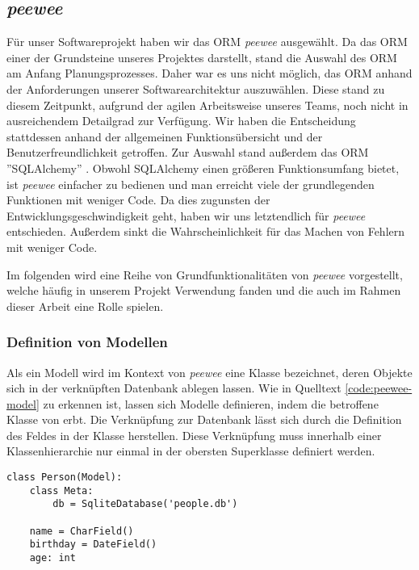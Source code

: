 \subsection{\emph{peewee}}
Für unser Softwareprojekt haben wir das ORM \emph{peewee} \cite{leifer_coleiferpeewee_2023} ausgewählt. Da das ORM einer der Grundsteine unseres Projektes darstellt, stand die Auswahl des ORM am Anfang Planungsprozesses. Daher war es uns nicht möglich, das ORM  anhand der Anforderungen unserer Softwarearchitektur auszuwählen. Diese stand zu diesem Zeitpunkt, aufgrund der agilen Arbeitsweise unseres Teams, noch nicht in ausreichendem Detailgrad zur Verfügung. Wir haben die Entscheidung stattdessen anhand der allgemeinen Funktionsübersicht und der Benutzerfreundlichkeit getroffen. Zur Auswahl stand außerdem das ORM ''SQLAlchemy'' \cite{noauthor_sqlalchemy_2023}. Obwohl SQLAlchemy einen größeren Funktionsumfang bietet, ist \emph{peewee} einfacher zu bedienen und man erreicht viele der grundlegenden Funktionen mit weniger Code. Da dies zugunsten der Entwicklungsgeschwindigkeit geht, haben wir uns letztendlich für \emph{peewee} entschieden. Außerdem sinkt die Wahrscheinlichkeit für das Machen von Fehlern mit weniger Code.

Im folgenden wird eine Reihe von Grundfunktionalitäten von \emph{peewee} vorgestellt, welche häufig in unserem Projekt Verwendung fanden und die auch im Rahmen dieser Arbeit eine Rolle spielen.

\subsubsection*{Definition von Modellen}

Als ein Modell wird im Kontext von \emph{peewee} eine Klasse bezeichnet, deren Objekte sich in der verknüpften Datenbank ablegen lassen. Wie in Quelltext \ref{code:peewee-model} zu erkennen ist, lassen sich Modelle definieren, indem die betroffene Klasse von  erbt. Die Verknüpfung zur Datenbank lässt sich durch die Definition des Feldes  in der Klasse  herstellen. Diese Verknüpfung muss innerhalb einer Klassenhierarchie nur einmal in der obersten Superklasse definiert werden.

\lstset{language=python}
\begin{lstlisting}[caption={Python-Code zur Definition eines \emph{peewee}-Modells. Es modelliert eine Person mit einem Namen und einem Geburtstag. Weiterhin besitzt die Klasse das nicht-persistente Feld \code{age}. \cite{noauthor_quickstart_2023}}, label=code:peewee-model]
class Person(Model):
    class Meta:
        db = SqliteDatabase('people.db')

    name = CharField()
    birthday = DateField()
    age: int
\end{lstlisting}

